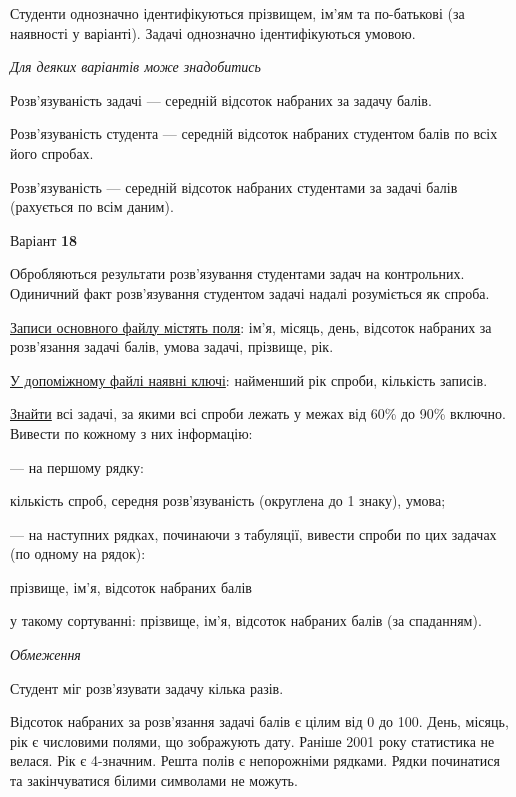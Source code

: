 \documentclass[11pt, ukrainian]{article}
\begin{document}
Студенти однозначно ідентифікуються прізвищем, ім’ям та по-батькові (за наявності у варіанті).
Задачі однозначно ідентифікуються умовою.

\bigskip\textit{Для деяких варіантів може знадобитись}

Розв'язуваність задачі --- середній відсоток набраних за задачу балів.

Розв'язуваність студента --- середній відсоток набраних студентом балів по всіх його спробах.

Розв'язуваність --- середній відсоток набраних студентами за задачі балів (рахується по всім даним).


\par
\newpage
{\center Варіант  \No \textbf { 18 }\par}
\bigskip
Обробляються результати розв’язування студентами задач на контрольних.
Одиничний факт роз\-в’я\-зу\-вання студентом задачі надалі розуміється як спроба.

\underline{Записи основного файлу містять поля}: ім’я, місяць, день, відсоток набраних за розв’язання задачі балів, умова задачі, прізвище, рік.

\underline{У допоміжному файлі наявні ключі}: найменший рік спроби, кількість записів.

\underline{Знайти} всі задачі, за якими всі спроби лежать у межах від 60\% до 90\% включно. Вивести по кожному з них інформацію:\par
{\noindent}--- на першому рядку:\par
кількість спроб, середня розв’язуваність (округлена до 1 знаку), умова;

{\noindent}--- на наступних рядках, починаючи з табуляції, вивести спроби по цих задачах (по одному на рядок):\par
прізвище, ім’я, відсоток набраних балів

{\noindent}у такому сортуванні: прізвище, ім’я, відсоток набраних балів (за спаданням).


\bigskip\textit{Обмеження}

Студент міг розв’язувати задачу кілька разів.

Відсоток набраних за розв’язання задачі балів є цілим від 0 до 100.
День, місяць, рік є числовими полями, що зображують дату.
Раніше 2001 року статистика не велася. Рік є 4-значним.
Решта полів є непорожніми рядками.
Рядки починатися та закінчуватися білими символами не можуть.
\end{document}

